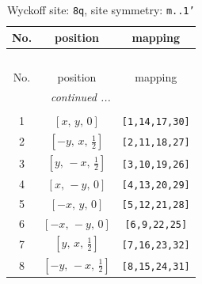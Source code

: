 \documentclass[fleqn,8pt]{jsarticle}
\begin{document}
\begin{longtable}{ccc}
\caption{Wyckoff site: {\tt 8q}, site symmetry: {\tt m..1'}}
 \\
 \hline \hline
No. & position & mapping \\ \hline \endfirsthead

\multicolumn{2}{l}{\tablename\ \thetable{}} \\
 \hline \hline
No. & position & mapping \\ \hline \endhead

 \hline \hline
\multicolumn{2}{r}{\footnotesize\it continued ...} \\ \endfoot

 \hline \hline
\multicolumn{2}{r}{} \\ \endlastfoot

1 & $\left[ x,\, y,\, 0 \right]$ & {\tt [1,14,17,30]} \\ \hline
2 & $\left[ - y,\, x,\, \frac{1}{2} \right]$ & {\tt [2,11,18,27]} \\ \hline
3 & $\left[ y,\, - x,\, \frac{1}{2} \right]$ & {\tt [3,10,19,26]} \\ \hline
4 & $\left[ x,\, - y,\, 0 \right]$ & {\tt [4,13,20,29]} \\ \hline
5 & $\left[ - x,\, y,\, 0 \right]$ & {\tt [5,12,21,28]} \\ \hline
6 & $\left[ - x,\, - y,\, 0 \right]$ & {\tt [6,9,22,25]} \\ \hline
7 & $\left[ y,\, x,\, \frac{1}{2} \right]$ & {\tt [7,16,23,32]} \\ \hline
8 & $\left[ - y,\, - x,\, \frac{1}{2} \right]$ & {\tt [8,15,24,31]} \\
\end{longtable}
\renewcommand{\arraystretch}{1.2}
\end{document}
